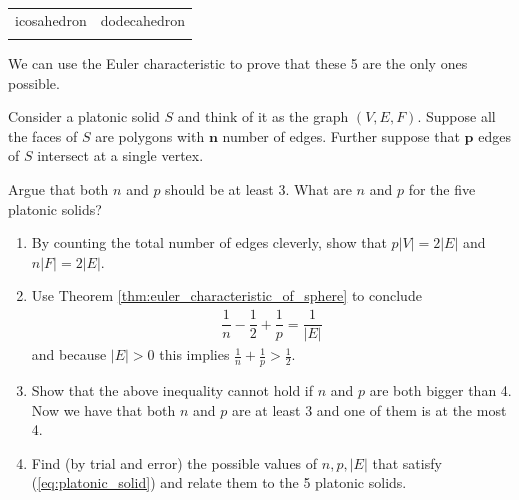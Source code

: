 \begin{center}\begin{tabular}{c c}
	icosahedron & dodecahedron \\\\
	\end{tabular}
\end{center}

We can use the Euler characteristic to prove that these 5 are the only ones possible.

Consider a platonic solid $ S $ and think of it as the graph $(V,E,F)$. Suppose all the faces of $ S $ are polygons with $ \mathbf{n} $ number of edges. Further suppose that $ \mathbf{p} $ edges of $S $ intersect at a single vertex.

\begin{exercise}
	Argue that both $ n $ and $ p $ should be at least 3. What are $ n$ and $ p $ for the five platonic solids?
\end{exercise}

\begin{exercise}\leavevmode
	\begin{enumerate}
		\item By counting the total number of edges cleverly, show that $ p |V| = 2 |E| $ and $ n |F| = 2|E| $.
		\item Use Theorem \ref{thm:euler_characteristic_of_sphere} to conclude
		      \begin{align}\label{eq:platonic_solid}
		      	\dfrac{1}{n} - \dfrac{1}{2} + \dfrac{1}{p} = \dfrac{1}{|E|}
		      \end{align}
		      and because $ |E| > 0 $ this implies $ \frac{1}{n} + \frac{1}{p} >  \frac{1}{2}$.
		\item Show that the above inequality cannot hold if $ n $ and $ p $ are both bigger than 4. Now we have that both $n$ and $p$ are at least 3 and one of them is at the most 4.
		\item Find (by trial and error) the possible values of $ n, p, |E| $ that satisfy (\ref{eq:platonic_solid}) and relate them to the 5 platonic solids.
	\end{enumerate}
\end{exercise}
\fi



